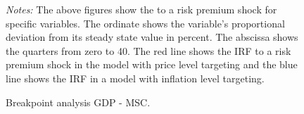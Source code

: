 \documentclass[11pt, a4paper, leqno]{article}
\begin{document}
\begin{figure}[ht!]
	\caption{Breakpoint analysis GDP - MSC.}
	\centering
    	\bigskip
	\begin{minipage}{\textwidth}%
		\footnotesize\setlength{\baselineskip}{11pt}%
		\bigskip \textit{Notes:} The above figures show the  to a risk premium shock for specific variables. The ordinate shows the variable's proportional deviation from its steady state value in percent. The abscissa shows the quarters from zero to 40. The red line shows the IRF to a risk premium shock in the model with price level targeting and the blue line shows the IRF in a model with inflation level targeting.
	\end{minipage}
\end{figure}
\end{document}
